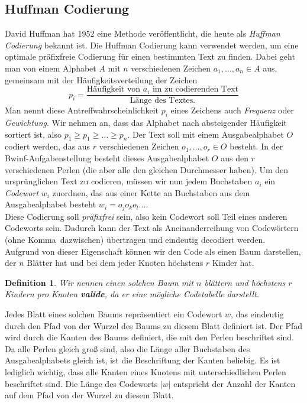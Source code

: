 \documentclass[a4paper,10pt,ngerman]{scrartcl}
\newtheorem{definition}[satz]{Definition}
\begin{document}
    \subsection{Huffman Codierung}
    David Huffman hat 1952 eine Methode veröffentlicht, die heute als \textit{Huffman Codierung} bekannt ist\autocite{noauthor_huffman-kodierung_2025}.
    Die Huffman Codierung kann verwendet werden, um eine optimale präfixfreie Codierung für einen bestimmten Text zu finden.
    Dabei geht man von einem Alphabet $A$ mit $n$ verschiedenen Zeichen $a_1, \dots, a_n \in A$ aus, gemeinsam mit der Häufigkeitsverteilung der Zeichen \[p_i = \frac {\text{Häufigkeit von $a_i$ im zu codierenden Text}} {\text{Länge des Textes.}}\]
    Man nennt diese Antreffwahrscheinlichkeit $p_i$ eines Zeichens auch \textit{Frequenz} oder \textit{Gewichtung}.
    Wir nehmen an, dass das Alphabet nach absteigender Häufigkeit sortiert ist, also $p_1 \ge p_1 \ge \dots \ge p_n$.
    Der Text soll mit einem Ausgabealphabet $O$ codiert werden, das aus $r$ verschiedenen Zeichen $o_1, \dots, o_r \in O$ besteht.
    In der Bwinf-Aufgabenstellung besteht dieses Ausgabealphabet $O$ aus den $r$ verschiedenen Perlen (die aber alle den gleichen Durchmesser haben). Um den ursprünglichen Text zu codieren, müssen wir nun jedem Buchstaben $a_i$ ein \textit{Codewort} $w_i$ zuordnen, das aus einer Kette an Buchstaben aus dem Ausgabealphabet besteht $w_i = o_j o_k o_l \dots$. \\
    Diese Codierung soll \textit{präfixfrei} sein, also kein Codewort soll Teil eines anderen Codeworts sein.
    Dadurch kann der Text als Aneinanderreihung von Codewörtern (ohne \glqq Komma\grqq~dazwischen) übertragen und eindeutig decodiert werden. \\
    Aufgrund von dieser Eigenschaft können wir den Code als einen Baum darstellen, der $n$ Blätter hat und bei dem jeder Knoten höchstens $r$ Kinder hat.
    \begin{definition}
        Wir nennen einen solchen Baum mit $n$ blättern und höchstens $r$ Kindern pro Knoten \textbf{valide}, da er eine mögliche Codetabelle darstellt.
    \end{definition}
    Jedes Blatt eines solchen Baums repräsentiert ein Codewort $w$, das eindeutig durch den Pfad von der Wurzel des Baums zu diesem Blatt definiert ist. Der Pfad wird durch die Kanten des Baums definiert, die mit den Perlen beschriftet sind. Da alle Perlen gleich groß sind, also die Länge aller Buchstaben des Ausgabealphabets gleich ist, ist die Beschriftung der Kanten beliebig. Es ist lediglich wichtig, dass alle Kanten eines Knotens mit unterschiedlichen Perlen beschriftet sind. Die Länge des Codeworts $|w|$ entspricht der Anzahl der Kanten auf dem Pfad von der Wurzel zu diesem Blatt. \\
\end{document}
